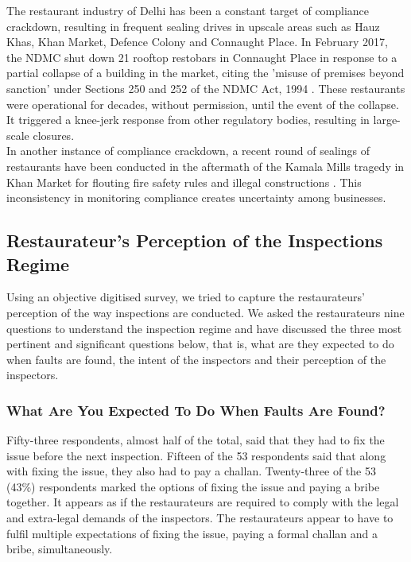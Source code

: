 \documentclass[a4paper, 12pt, twoside]{article}
\begin{document}
		The restaurant industry of Delhi has been a constant target of compliance crackdown, resulting in frequent sealing drives in upscale areas such as Hauz Khas, Khan Market, Defence Colony and Connaught Place. In February 2017, the NDMC shut down 
21 rooftop restobars in Connaught Place in response to a partial collapse of a building in the market, citing the 'misuse of premises beyond sanction' under Sections 250 and 252 of the NDMC Act, 1994 \parencite{toi2017rooftopbanCP}. These restaurants were 
operational for decades, without permission, until the event of the collapse. It triggered a knee-jerk response from other regulatory bodies, resulting in large-scale closures.\\
		
		In another instance of compliance crackdown, a recent round of sealings of restaurants have been conducted in the aftermath of the Kamala Mills tragedy in Khan Market for flouting fire safety rules and illegal constructions \parencite{fp2018khanmarketsealing}. This 
inconsistency in monitoring compliance creates uncertainty among businesses.
		
		\subsection{Restaurateur’s Perception of the Inspections Regime}
		Using an objective digitised survey, we tried to capture the restaurateurs’ perception of the way inspections are conducted. We asked the restaurateurs nine questions to understand the inspection regime and have discussed the three most pertinent and 
significant questions below, that is, what are they expected to do when faults are found, the intent of the inspectors and their perception of the inspectors.

		\subsubsection {What Are You Expected To Do When Faults Are Found?}
		Fifty-three respondents, almost half of the total, said that they had to fix the issue before the next inspection. Fifteen of the 53 respondents said that along with fixing the issue, they also had to pay a challan. Twenty-three of the 53 (43\%) respondents 
marked the options of fixing the issue and paying a bribe together. It appears as if the restaurateurs are required to comply with the legal and extra-legal demands of the inspectors. The restaurateurs appear to have to fulfil multiple expectations of fixing the issue, 
paying a formal challan and a bribe, simultaneously.
\end{document}
